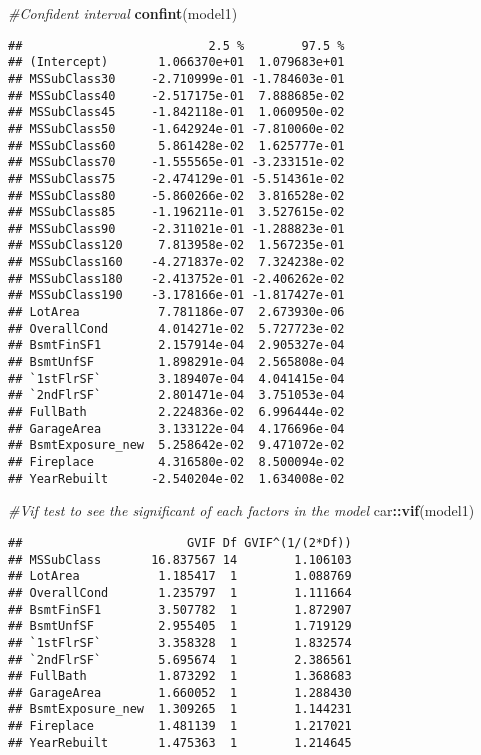 \documentclass[]{article}
\newenvironment{Shaded}{\begin{snugshade}}{\end{snugshade}}
\newcommand{\CommentTok}[1]{\textcolor[rgb]{0.56,0.35,0.01}{\textit{#1}}}
\newcommand{\KeywordTok}[1]{\textcolor[rgb]{0.13,0.29,0.53}{\textbf{#1}}}
\newcommand{\NormalTok}[1]{#1}
\newcommand{\OperatorTok}[1]{\textcolor[rgb]{0.81,0.36,0.00}{\textbf{#1}}}
\begin{document}
\begin{Shaded}
\begin{Highlighting}[]
\CommentTok{#Confident interval}
\KeywordTok{confint}\NormalTok{(model1)}
\end{Highlighting}
\end{Shaded}

\begin{verbatim}
##                          2.5 %        97.5 %
## (Intercept)       1.066370e+01  1.079683e+01
## MSSubClass30     -2.710999e-01 -1.784603e-01
## MSSubClass40     -2.517175e-01  7.888685e-02
## MSSubClass45     -1.842118e-01  1.060950e-02
## MSSubClass50     -1.642924e-01 -7.810060e-02
## MSSubClass60      5.861428e-02  1.625777e-01
## MSSubClass70     -1.555565e-01 -3.233151e-02
## MSSubClass75     -2.474129e-01 -5.514361e-02
## MSSubClass80     -5.860266e-02  3.816528e-02
## MSSubClass85     -1.196211e-01  3.527615e-02
## MSSubClass90     -2.311021e-01 -1.288823e-01
## MSSubClass120     7.813958e-02  1.567235e-01
## MSSubClass160    -4.271837e-02  7.324238e-02
## MSSubClass180    -2.413752e-01 -2.406262e-02
## MSSubClass190    -3.178166e-01 -1.817427e-01
## LotArea           7.781186e-07  2.673930e-06
## OverallCond       4.014271e-02  5.727723e-02
## BsmtFinSF1        2.157914e-04  2.905327e-04
## BsmtUnfSF         1.898291e-04  2.565808e-04
## `1stFlrSF`        3.189407e-04  4.041415e-04
## `2ndFlrSF`        2.801471e-04  3.751053e-04
## FullBath          2.224836e-02  6.996444e-02
## GarageArea        3.133122e-04  4.176696e-04
## BsmtExposure_new  5.258642e-02  9.471072e-02
## Fireplace         4.316580e-02  8.500094e-02
## YearRebuilt      -2.540204e-02  1.634008e-02
\end{verbatim}

\begin{Shaded}
\begin{Highlighting}[]
\CommentTok{#Vif test to see the significant of each factors in the model }
\NormalTok{car}\OperatorTok{::}\KeywordTok{vif}\NormalTok{(model1)}
\end{Highlighting}
\end{Shaded}

\begin{verbatim}
##                       GVIF Df GVIF^(1/(2*Df))
## MSSubClass       16.837567 14        1.106103
## LotArea           1.185417  1        1.088769
## OverallCond       1.235797  1        1.111664
## BsmtFinSF1        3.507782  1        1.872907
## BsmtUnfSF         2.955405  1        1.719129
## `1stFlrSF`        3.358328  1        1.832574
## `2ndFlrSF`        5.695674  1        2.386561
## FullBath          1.873292  1        1.368683
## GarageArea        1.660052  1        1.288430
## BsmtExposure_new  1.309265  1        1.144231
## Fireplace         1.481139  1        1.217021
## YearRebuilt       1.475363  1        1.214645
\end{verbatim}
\end{document}

